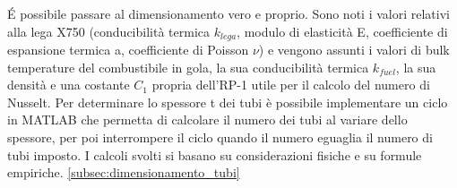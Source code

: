 \'E possibile passare al dimensionamento vero e proprio. Sono noti i valori relativi alla lega X750 (conducibilità termica $k_{lega}$, modulo di elasticità E, coefficiente di espansione termica a, coefficiente di Poisson $\nu$) e vengono assunti i valori di bulk temperature del combustibile in gola, la sua conducibilità termica $k_{fuel}$, la sua densità e una costante $C_1$ propria dell’RP-1 utile per il calcolo del numero di Nusselt. \cite{AIAA_book_1}\cite{AIAA_book_2}
Per determinare lo spessore t dei tubi è possibile implementare un ciclo in MATLAB che permetta di calcolare il numero dei tubi al variare dello spessore, per poi interrompere il ciclo quando il numero eguaglia il numero di tubi imposto. I calcoli svolti si basano su considerazioni fisiche e su formule empiriche.
\autoref{subsec:dimensionamento_tubi}
